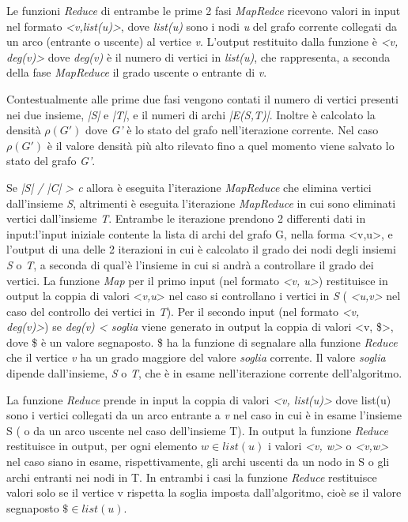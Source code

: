 \documentclass[LaM,binding=0.6cm]{sapthesis}
\begin{document}
Le funzioni \textit{Reduce} di entrambe le prime 2 fasi   \textit{MapRedce} ricevono valori in input nel formato \textit{<v,list(u)>}, dove \textit{list(u)} sono i nodi  \textit{u} del grafo corrente collegati da un arco (entrante o uscente) al vertice \textit{v}. L'output restituito dalla funzione è \textit{<v, deg(v)>} dove \textit{deg(v)} è il numero di vertici in \textit{list(u)}, che rappresenta, a seconda della fase \textit{MapReduce} il grado uscente o entrante di \textit{v}.

Contestualmente alle prime due fasi vengono contati il numero di vertici presenti nei due insieme, \textit{|S|} e \textit{|T|}, e il numeri di archi \textit{|E(S,T)|}. Inoltre è calcolato la densità $\rho(G')$ dove \textit{G'} è lo stato del grafo nell'iterazione corrente. Nel caso $\rho(G')$ è il valore densità più alto rilevato fino a quel momento viene salvato lo stato del grafo \textit{G'}.

Se \textit{|S| / |C| > c} allora è eseguita l'iterazione \textit{MapReduce} che elimina vertici dall'insieme \textit{S}, altrimenti è eseguita l'iterazione \textit{MapReduce} in cui sono eliminati vertici dall'insieme \textit{T}. Entrambe le iterazione prendono 2 differenti dati in input:l'input iniziale contente la lista di archi del grafo G, nella forma <v,u>, e  l'output di una delle 2 iterazioni in cui è calcolato il grado dei nodi degli insiemi \textit{S} o \textit{T}, a seconda di qual'è l'insieme in cui si andrà a controllare il grado dei vertici.
La funzione \textit{Map} per il primo input (nel formato \textit{<v, u>}) restituisce in output la coppia di valori <\textit{v,u}> nel caso si controllano i vertici in \textit{S} ( \textit{<u,v>} nel caso del controllo dei vertici in \textit{T}). 
Per il secondo  input (nel formato \textit{<v, deg(v)>}) se \textit{deg(v) < soglia} viene generato in output la coppia di valori <v, \$>, dove \$ è un valore segnaposto. \$ ha la funzione di segnalare alla funzione \textit{Reduce} che il vertice \textit{v} ha un grado maggiore del valore \textit{soglia} corrente. Il valore \textit{soglia} dipende dall'insieme, \textit{S} o \textit{T}, che è in esame nell'iterazione corrente dell'algoritmo.

La funzione \textit{Reduce} prende in input la coppia di valori \textit{<v, list(u)>} dove list(u) sono i vertici collegati da un arco entrante a \textit{v} nel caso in cui è in esame l'insieme S ( o da un arco uscente nel caso dell'insieme T).
In output la funzione \textit{Reduce} restituisce in output, per ogni elemento \textit{$w \in list(u)$} i valori \textit{<v, w>} o \textit{<v,w>} nel caso siano in esame, rispettivamente, gli archi uscenti da un nodo in S o gli archi entranti nei nodi in T. In entrambi i casi la funzione \textit{Reduce} restituisce valori solo se il vertice v rispetta la soglia imposta dall'algoritmo, cioè se il valore segnaposto \textit{$\$ \in list(u) $}.
\end{document}
